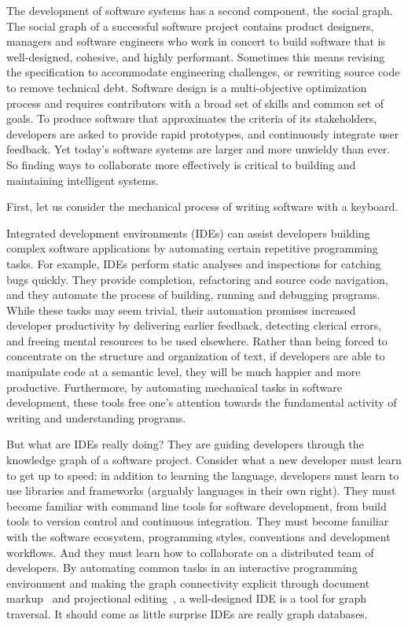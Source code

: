 \documentclass[12pt,initial,twoside,maitrise]{dms}
\numberwithin{equation}{section}
\numberwithin{table}{chapter}
\numberwithin{figure}{chapter}
\begin{document}
The development of software systems has a second component, the social graph. The social graph of a successful software project contains product designers, managers and software engineers who work in concert to build software that is well-designed, cohesive, and highly performant. Sometimes this means revising the specification to accommodate engineering challenges, or rewriting source code to remove technical debt. Software design is a multi-objective optimization process and requires contributors with a broad set of skills and common set of goals. To produce software that approximates the criteria of its stakeholders, developers are asked to provide rapid prototypes, and continuously integrate user feedback. Yet today's software systems are larger and more unwieldy than ever. So finding ways to collaborate more effectively is critical to building and maintaining intelligent systems.

First, let us consider the mechanical process of writing software with a keyboard.

Integrated development environments (IDEs) can assist developers building complex software applications by automating certain repetitive programming tasks. For example, IDEs perform static analyses and inspections for catching bugs quickly. They provide completion, refactoring and source code navigation, and they automate the process of building, running and debugging programs. While these tasks may seem trivial, their automation promises increased developer productivity by delivering earlier feedback, detecting clerical errors, and freeing mental resources to be used elsewhere. Rather than being forced to concentrate on the structure and organization of text, if developers are able to manipulate code at a semantic level, they will be much happier and more productive. Furthermore, by automating mechanical tasks in software development, these tools free one's attention towards the fundamental activity of writing and understanding programs.

But what are IDEs really doing? They are guiding developers through the knowledge graph of a software project. Consider what a new developer must learn to get up to speed: in addition to learning the language, developers must learn to use libraries and frameworks (arguably languages in their own right). They must become familiar with command line tools for software development, from build tools to version control and continuous integration. They must become familiar with the software ecosystem, programming styles, conventions and development workflows. And they must learn how to collaborate on a distributed team of developers. By automating common tasks in an interactive programming environment and making the graph connectivity explicit through document markup~\citep{goldfarb1981generalized} and projectional editing~\citep{voelter2014towards}, a well-designed IDE is a tool for graph traversal. It should come as little surprise IDEs are really graph databases.
\end{document}
